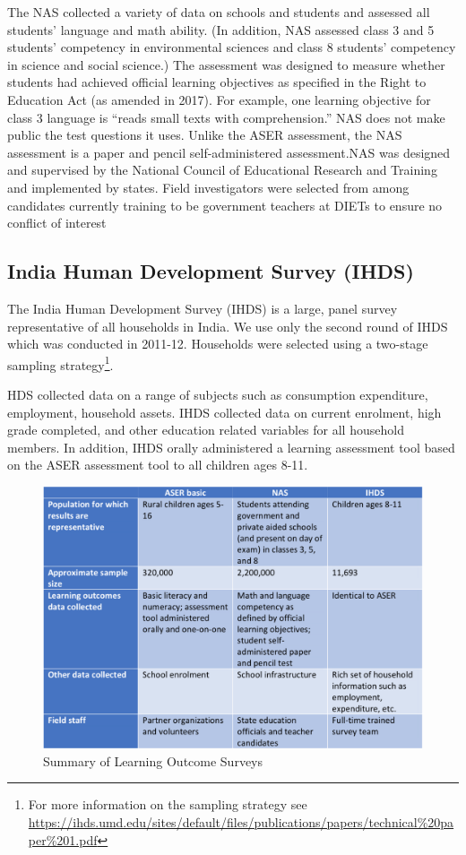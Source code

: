 \documentclass[
  11pt,
]{article}
\begin{document}
The NAS collected a variety of data on schools and students and assessed all students' language and math ability. (In addition, NAS assessed class 3 and 5 students' competency in environmental sciences and class 8 students' competency in science and social science.) The assessment was designed to measure whether students had achieved official learning objectives as specified in the Right to Education Act (as amended in 2017). For example, one learning objective for class 3 language is ``reads small texts with comprehension.'' NAS does not make public the test questions it uses. Unlike the ASER assessment, the NAS assessment is a paper and pencil self-administered assessment.NAS was designed and supervised by the National Council of Educational Research and Training and implemented by states. Field investigators were selected from among candidates currently training to be government teachers at DIETs to ensure no conflict of interest

\hypertarget{india-human-development-survey-ihds}{%
\subsection{India Human Development Survey (IHDS)}\label{india-human-development-survey-ihds}}

The India Human Development Survey (IHDS) is a large, panel survey representative of all households in India. We use only the second round of IHDS which was conducted in 2011-12. Households were selected using a two-stage sampling strategy\footnote{For more information on the sampling strategy see
  \url{https://ihds.umd.edu/sites/default/files/publications/papers/technical\%20paper\%201.pdf}}.

HDS collected data on a range of subjects such as consumption expenditure, employment, household assets. IHDS collected data on current enrolment, high grade completed, and other education related variables for all household members. In addition, IHDS orally administered a learning assessment tool based on the ASER assessment tool to all children ages 8-11.

\begin{figure}

{\centering \includegraphics[width=0.8\linewidth]{summary_learning_outcomes} 

}

\caption{Summary of Learning Outcome Surveys}\label{fig:learningoutcomes}
\end{figure}
\end{document}
